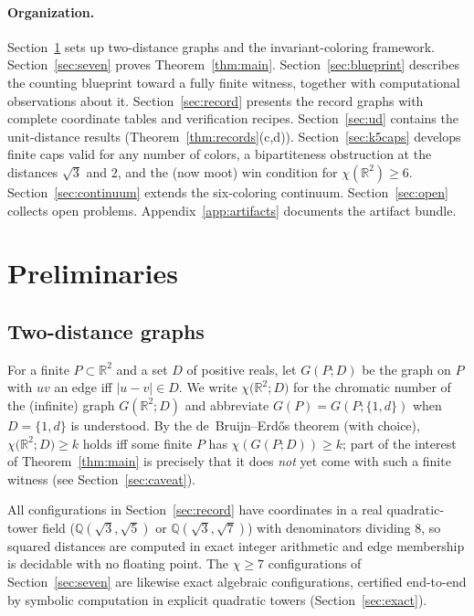 \documentclass[11pt]{article}
\theoremstyle{definition}
\theoremstyle{remark}
\newcommand{\R}{\mathbb{R}}
\newcommand{\Q}{\mathbb{Q}}
\newcommand{\dd}{d}                          %
\newcommand{\chid}[1]{\chi\bigl(\R^2;#1\bigr)}
\begin{document}
\paragraph{Organization.}
Section~\ref{sec:prelim} sets up two-distance graphs and the
invariant-coloring framework.  Section~\ref{sec:seven} proves
Theorem~\ref{thm:main}.  Section~\ref{sec:blueprint} describes the
counting blueprint toward a fully finite witness, together with
computational observations about it.  Section~\ref{sec:record} presents
the record graphs with complete coordinate tables and verification
recipes.  Section~\ref{sec:ud} contains the unit-distance results
(Theorem~\ref{thm:records}(c,d)).  Section~\ref{sec:k5caps} develops
finite caps valid for any number of colors, a bipartiteness obstruction
at the distances $\sqrt3$ and $2$, and the (now moot) win condition for
$\chi(\R^2)\ge6$.  Section~\ref{sec:continuum} extends the six-coloring
continuum.  Section~\ref{sec:open} collects open problems.
Appendix~\ref{app:artifacts} documents the artifact bundle.

\section{Preliminaries}\label{sec:prelim}

\subsection{Two-distance graphs}

For a finite $P\subset\R^2$ and a set $D$ of positive reals, let $G(P;D)$
be the graph on $P$ with $uv$ an edge iff $|u-v|\in D$.  We write
$\chid{D}$ for the chromatic number of the (infinite) graph $G(\R^2;D)$
and abbreviate $G(P)=G(P;\{1,\dd\})$ when $D=\{1,\dd\}$ is understood.
By the de~Bruijn--Erd\H{o}s theorem (with choice), $\chid{D}\ge k$
holds iff some finite $P$ has $\chi(G(P;D))\ge k$; part of the interest
of Theorem~\ref{thm:main} is precisely that it does \emph{not} yet come
with such a finite witness (see Section~\ref{sec:caveat}).

All configurations in Section~\ref{sec:record} have coordinates in a real
quadratic-tower field ($\Q(\sqrt3,\sqrt5)$ or $\Q(\sqrt3,\sqrt7)$) with
denominators dividing $8$, so squared distances are computed in exact
integer arithmetic and edge membership is decidable with no floating
point.  The $\chi\ge7$ configurations of Section~\ref{sec:seven} are
likewise exact algebraic configurations, certified end-to-end by
symbolic computation in explicit quadratic towers
(Section~\ref{sec:exact}).
\end{document}

